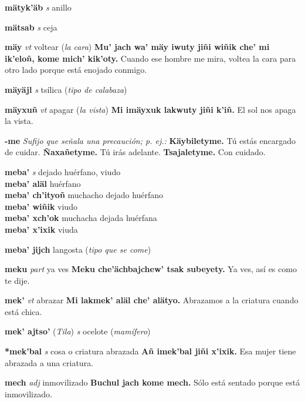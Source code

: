 \documentclass[10pt]{scrbook}
\newcommand{\entry}[1]{\textbf{#1}}
\newcommand{\nontranslationdef}[1]{\textit{#1}}
\newcommand{\partofspeech}[1]{\textit{#1}}
\newcommand{\spanishtranslation}[1]{#1}
\newcommand{\clarification}[1]{(\textit{#1})}
\newcommand{\cholexample}[1]{\textbf{#1}}
\newcommand{\exampletranslation}[1]{#1}
\newcommand{\relevantdialect}[1]{(\textit{#1})}
\newcommand{\secondaryentry}[1]{\\\textbf{#1}}
\newcommand{\secondtranslation}[1]{#1}
\begin{document}
\begin{multicols}{2}
\entry{mätyk'äb}
\partofspeech{s}
\spanishtranslation{anillo}

\entry{mätsab}
\partofspeech{s}
\spanishtranslation{ceja}

\entry{mäy}
\partofspeech{vt}
\spanishtranslation{voltear}
\clarification{la cara}
\cholexample{Mu' jach wa' mäy iwuty jiñi wiñik che' mi ik'eloñ, kome mich' kik'oty.}
\exampletranslation{Cuando ese hombre me mira, voltea la cara para otro lado porque está enojado conmigo.}

\entry{mäyäjl}
\partofspeech{s}
\spanishtranslation{tsílica}
\clarification{tipo de calabaza}

\entry{mäyxuñ}
\partofspeech{vt}
\spanishtranslation{apagar}
\clarification{la vista}
\cholexample{Mi imäyxuk lakwuty jiñi k'iñ.}
\exampletranslation{El sol nos apaga la vista.}

\entry{-me}
\nontranslationdef{Sufijo que señala una precaución; p. ej.:}
\cholexample{Käybiletyme.}
\exampletranslation{Tú estás encargado de cuidar.}
\cholexample{Ñaxañetyme.}
\exampletranslation{Tú irás adelante.}
\cholexample{Tsajaletyme.}
\exampletranslation{Con cuidado.}

\entry{meba'}
\partofspeech{s}
\spanishtranslation{dejado huérfano, viudo}
\secondaryentry{meba' aläl}
\secondtranslation{huérfano}
\secondaryentry{meba' ch'ityoñ}
\secondtranslation{muchacho dejado huérfano}
\secondaryentry{meba' wiñik}
\secondtranslation{viudo}
\secondaryentry{meba' xch'ok}
\secondtranslation{muchacha dejada huérfana}
\secondaryentry{meba' x'ixik}
\secondtranslation{viuda}

\entry{meba' jijch}
\spanishtranslation{langosta}
\clarification{tipo que se come}

\entry{meku}
\partofspeech{part}
\spanishtranslation{ya ves}
\cholexample{Meku che'ächbajchew' tsak subeyety.}
\exampletranslation{Ya ves, así es como te dije.}

\entry{mek'}
\partofspeech{vt}
\spanishtranslation{abrazar}
\cholexample{Mi lakmek' aläl che' alätyo.}
\exampletranslation{Abrazamos a la criatura cuando está chica.}

\entry{mek' ajtso'}
\relevantdialect{Tila}
\partofspeech{s}
\spanishtranslation{ocelote}
\clarification{mamífero}

\entry{*mek'bal}
\partofspeech{s}
\spanishtranslation{cosa o criatura abrazada}
\cholexample{Añ imek'bal jiñi x'ixik.}
\exampletranslation{Esa mujer tiene abrazada a una criatura.}

\entry{mech}
\partofspeech{adj}
\spanishtranslation{inmovilizado}
\cholexample{Buchul jach kome mech.}
\exampletranslation{Sólo está sentado porque está inmovilizado.}


\end{multicols}
\end{document}
